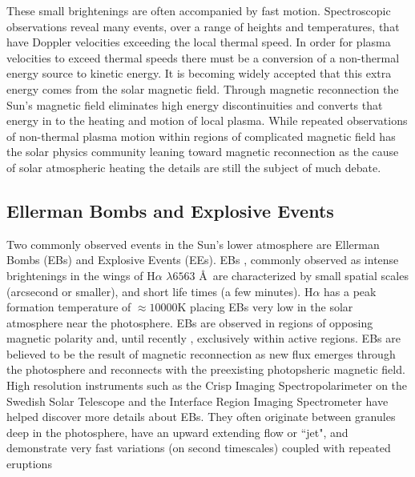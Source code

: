 \documentclass[]{aastex6}
\begin{document}
	These small brightenings are often accompanied by fast motion.  Spectroscopic observations reveal many events, over a range of heights and temperatures, that have Doppler velocities exceeding the local thermal speed.  In order for plasma velocities to exceed  thermal speeds there must be a conversion of a non-thermal energy source to kinetic energy. It is becoming widely accepted that this extra energy comes from the solar magnetic field.  Through magnetic reconnection the Sun's magnetic field eliminates high energy discontinuities and converts that energy in to the heating and motion of local plasma.  While repeated observations of non-thermal plasma motion within regions of complicated magnetic field has the solar physics community leaning toward magnetic reconnection as the cause of solar atmospheric heating the details are still the subject of much debate.	

	\subsection{Ellerman Bombs and Explosive Events}
	
	Two commonly observed events in the Sun's lower atmosphere are Ellerman Bombs (EBs) and Explosive Events (EEs). EBs \citep{Ellerman1917}, commonly observed as intense brightenings in the wings of H$\alpha$ $\lambda 6563$ \AA \,  are characterized by small spatial scales (arcsecond or smaller), and short life times (a few minutes). H$\alpha$ has a peak formation temperature of $\approx 10000$K placing EBs very low in the solar atmosphere near the photosphere. EBs are observed in regions of opposing magnetic polarity and, until recently \citep{Nelson2017}, exclusively within active regions.  EBs are believed to be the result of magnetic reconnection as new flux emerges through the photosphere and reconnects with the preexisting photopsheric magnetic field.  High resolution instruments such as the Crisp Imaging Spectropolarimeter \citep[CRISP;][]{CHRISP} on the Swedish Solar Telescope \citep[SST;][]{SST} and the Interface Region Imaging Spectrometer \citep[IRIS;][]{IRIS} have helped discover more details about EBs.  They often originate between granules deep in the photosphere, have an upward extending flow or ``jet", and demonstrate very fast variations (on second timescales) coupled with repeated eruptions \citep{Watanabe2011,Vissers2013,Vissers2015}
	
\end{document}
